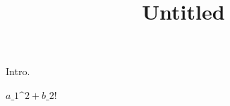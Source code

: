 \documentclass[11pt]{article}
\title{Untitled}
\date{}
\begin{document}
\maketitle

Intro.

$\displaystyle a\_1\^{}2 + b\_2$!
\end{document}
